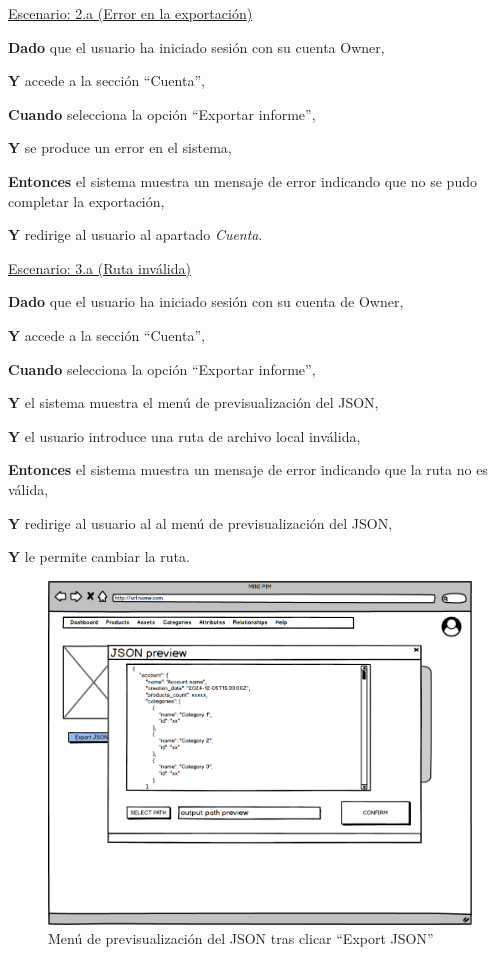 \underline{Escenario: 2.a (Error en la exportación)}\par
\vspace{0.15cm}
\textbf{Dado} que el usuario ha iniciado sesión con su cuenta Owner,\par 
\textbf{Y} accede a la sección \enquote{Cuenta},\par 
\textbf{Cuando} selecciona la opción \enquote{Exportar informe}, \par
\textbf{Y} se produce un error en el sistema,\par
\textbf{Entonces} el sistema muestra un mensaje de error indicando que no se pudo completar la exportación,\par
\textbf{Y} redirige al usuario al apartado \textit{Cuenta}.\par
\vspace{0.20cm}

\underline{Escenario: 3.a (Ruta inválida)}\par
\vspace{0.15cm}
\textbf{Dado} que el usuario ha iniciado sesión con su cuenta de Owner,\par 
\textbf{Y} accede a la sección \enquote{Cuenta},\par 
\textbf{Cuando} selecciona la opción \enquote{Exportar informe},\par
\textbf{Y} el sistema muestra el menú de previsualización del JSON,\par
\textbf{Y} el usuario introduce una ruta de archivo local inválida,\par
\textbf{Entonces} el sistema muestra un mensaje de error indicando que la ruta no es válida,\par
\textbf{Y} redirige al usuario al al menú de previsualización del JSON,\par
\textbf{Y} le permite cambiar la ruta.\par
\vspace{0.20cm}

\newpage %

\begin{figure}[H]
    \includegraphics[width=1\linewidth]{mockups/RF1.9.1ExportarInformeCuenta.png}
    \caption{Menú de previsualización del JSON tras clicar \enquote{Export JSON}}
   \end{figure}
\vspace{1.0cm}

\newpage %